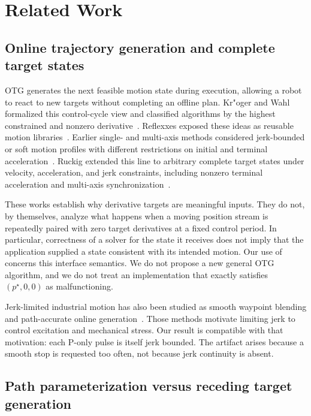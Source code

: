 \section{Related Work}
\label{sec:related}

\subsection{Online trajectory generation and complete target states}

OTG generates the next feasible motion state during execution, allowing a robot to react to new targets without completing an offline plan. Kr{"o}ger and Wahl formalized this control-cycle view and classified algorithms by the highest constrained and nonzero derivative~\cite{kroeger2010otg,kroeger2010book}. Reflexxes exposed these ideas as reusable motion libraries~\cite{kroeger2011reflexxes}. Earlier single- and multi-axis methods considered jerk-bounded or soft motion profiles with different restrictions on initial and terminal acceleration~\cite{macfarlane2003jerk,broquere2008soft,haschke2008online}. Ruckig extended this line to arbitrary complete target states under velocity, acceleration, and jerk constraints, including nonzero terminal acceleration and multi-axis synchronization~\cite{berscheid2021ruckig}.

These works establish why derivative targets are meaningful inputs. They do not, by themselves, analyze what happens when a moving position stream is repeatedly paired with zero target derivatives at a fixed control period. In particular, correctness of a solver for the state it receives does not imply that the application supplied a state consistent with its intended motion. Our use of \termismatch{} concerns this interface semantics. We do not propose a new general OTG algorithm, and we do not treat an implementation that exactly satisfies $(p^\star,0,0)$ as malfunctioning.

Jerk-limited industrial motion has also been studied as smooth waypoint blending and path-accurate online generation~\cite{macfarlane2003jerk,lange2016path,biagiotti2008trajectory}. Those methods motivate limiting jerk to control excitation and mechanical stress. Our result is compatible with that motivation: each P-only pulse is itself jerk bounded. The artifact arises because a smooth stop is requested too often, not because jerk continuity is absent.

\subsection{Path parameterization versus receding target generation}

